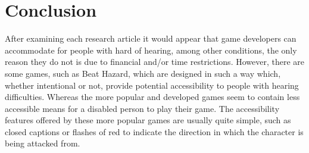 \documentclass{scrartcl}
\begin{document}
\section{Conclusion}
After examining each research article it would appear that game developers can accommodate for people with hard of hearing, among other conditions, the only reason they do not is due to
financial and/or time restrictions. However, there are some games, such as Beat Hazard, which are designed in such a way which, whether intentional or not, provide potential accessibility to people with hearing difficulties. Whereas the more popular and developed games seem to contain less accessible means for a disabled person to play their game. The accessibility features offered by these more popular games are usually quite simple, such as closed captions or flashes of red to indicate the direction in which the character is being attacked from.



\end{document}
